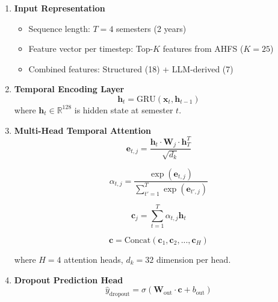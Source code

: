 \begin{enumerate}
\item \textbf{Input Representation}
\begin{itemize}
\item Sequence length: $T=4$ semesters (2 years)
\item Feature vector per timestep: Top-$K$ features from AHFS ($K=25$)
\item Combined features: Structured (18) + LLM-derived (7)
\end{itemize}

\item \textbf{Temporal Encoding Layer}
\begin{equation}
\mathbf{h}_t = \text{GRU}(\mathbf{x}_t, \mathbf{h}_{t-1})
\end{equation}
where $\mathbf{h}_t \in \mathbb{R}^{128}$ is hidden state at semester $t$.

\item \textbf{Multi-Head Temporal Attention}
\begin{equation}
\mathbf{e}_{t,j} = \frac{\mathbf{h}_t \cdot \mathbf{W}_j \cdot \mathbf{h}_T^T}{\sqrt{d_k}}
\end{equation}

\begin{equation}
\alpha_{t,j} = \frac{\exp(\mathbf{e}_{t,j})}{\sum_{t'=1}^{T} \exp(\mathbf{e}_{t',j})}
\end{equation}

\begin{equation}
\mathbf{c}_j = \sum_{t=1}^{T} \alpha_{t,j} \mathbf{h}_t
\end{equation}

\begin{equation}
\mathbf{c} = \text{Concat}(\mathbf{c}_1, \mathbf{c}_2, ..., \mathbf{c}_H)
\end{equation}

where $H=4$ attention heads, $d_k=32$ dimension per head.

\item \textbf{Dropout Prediction Head}
\begin{equation}
\hat{y}_{\text{dropout}} = \sigma(\mathbf{W}_{\text{out}} \cdot \mathbf{c} + b_{\text{out}})
\end{equation}
\end{enumerate}

